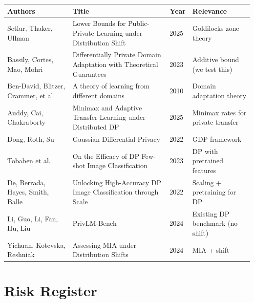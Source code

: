 \documentclass[11pt,a4paper]{article}
\begin{document}
\begin{small}
\begin{longtable}{@{}p{3.2cm}p{5.5cm}p{0.7cm}p{3cm}@{}}
\toprule
\textbf{Authors} & \textbf{Title} & \textbf{Year} & \textbf{Relevance} \\
\midrule
\endhead
Setlur, Thaker, Ullman & Lower Bounds for Public-Private Learning under Distribution Shift & 2025 & Goldilocks zone theory \\
Bassily, Cortes, Mao, Mohri & Differentially Private Domain Adaptation with Theoretical Guarantees & 2023 & Additive bound (we test this) \\
Ben-David, Blitzer, Crammer, et al. & A theory of learning from different domains & 2010 & Domain adaptation theory \\
Auddy, Cai, Chakraborty & Minimax and Adaptive Transfer Learning under Distributed DP & 2025 & Minimax rates for private transfer \\
Dong, Roth, Su & Gaussian Differential Privacy & 2022 & GDP framework \\
Tobaben et al. & On the Efficacy of DP Few-shot Image Classification & 2023 & DP with pretrained features \\
De, Berrada, Hayes, Smith, Balle & Unlocking High-Accuracy DP Image Classification through Scale & 2022 & Scaling + pretraining for DP \\
Li, Guo, Li, Fan, Hu, Liu & PrivLM-Bench & 2024 & Existing DP benchmark (no shift) \\
Yichuan, Kotevska, Reshniak & Assessing MIA under Distribution Shifts & 2024 & MIA + shift \\
\bottomrule
\end{longtable}
\end{small}

\section{Risk Register}
\end{document}
